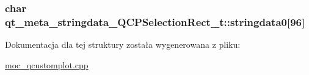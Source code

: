 \subsubsection[{\texorpdfstring{stringdata0}{stringdata0}}]{\setlength{\rightskip}{0pt plus 5cm}char qt\+\_\+meta\+\_\+stringdata\+\_\+\+Q\+C\+P\+Selection\+Rect\+\_\+t\+::stringdata0\mbox{[}96\mbox{]}}\hypertarget{structqt__meta__stringdata___q_c_p_selection_rect__t_a39a87de1040c403f0ba00fdaedecbb79}{}\label{structqt__meta__stringdata___q_c_p_selection_rect__t_a39a87de1040c403f0ba00fdaedecbb79}


Dokumentacja dla tej struktury została wygenerowana z pliku\+:\begin{DoxyCompactItemize}
\item 
\hyperlink{moc__qcustomplot_8cpp}{moc\+\_\+qcustomplot.\+cpp}\end{DoxyCompactItemize}
